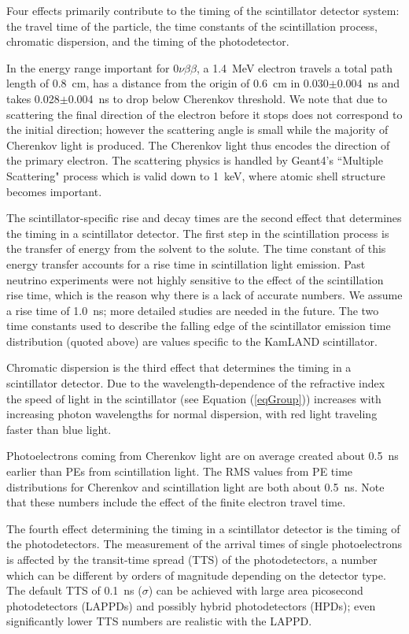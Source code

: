 Four effects primarily contribute to the timing of the scintillator detector
system: the travel time of the particle, the time constants of the scintillation process, chromatic dispersion, and the timing of the photodetector.

In the energy range important for $0\nu\beta\beta$, a 1.4~MeV electron travels a total path length of 0.8~cm, has a distance from the origin of 0.6~cm in 0.030$\pm$0.004~ns  and takes 0.028$\pm$0.004~ns to drop below Cherenkov threshold. We note that due to scattering the final direction of the electron before it stops does not correspond to the initial direction; however the scattering angle is small while the majority of Cherenkov light is produced. The Cherenkov light thus encodes the direction of the primary electron. The scattering physics is handled by Geant4's ``Multiple Scattering" process which is valid down to 1~keV, where atomic shell structure becomes important\cite{geant4scatt}.


The scintillator-specific rise and decay times are the second effect that determines the timing in a scintillator detector. The first step in the scintillation process is the transfer of energy from the solvent to the solute. The time constant of this
energy transfer accounts for a rise time in scintillation light
emission. Past neutrino experiments were not highly sensitive to the
effect of the scintillation rise time, which is the reason why there
is a lack of accurate numbers. We assume a rise time of 1.0~ns; more
detailed studies are needed in the future. The two time constants used
to describe the falling edge of the scintillator emission time
distribution (quoted above) are values specific to the KamLAND
scintillator.

Chromatic dispersion is the third effect that determines the timing in a scintillator detector. Due to the wavelength-dependence of the refractive index the speed of
light in the scintillator (see Equation (\ref{eqGroup})) increases
with increasing photon wavelengths for normal dispersion, with red
light traveling faster than blue light.

Photoelectrons coming from Cherenkov light are on average
created about 0.5~ns earlier than PEs from scintillation light. The
RMS values from PE time distributions for Cherenkov and scintillation
light are both about 0.5~ns. Note that these numbers include the
effect of the finite electron travel time.

The fourth effect determining the timing in a scintillator detector is the timing of the photodetectors. The measurement of the arrival times of single photoelectrons is
affected by the transit-time spread (TTS) of the photodetectors, a
number which can be different by orders of magnitude depending on the
detector type. The default TTS of 0.1~ns ($\sigma$) can be achieved with large area picosecond photodetectors
(LAPPDs)\cite{Adams:2013nva,RSI_paper,PSEC4_paper,anode_paper} and possibly hybrid photodetectors
(HPDs)\cite{hpdThesis}; even significantly lower TTS numbers are
realistic with the LAPPD\cite{RSI_paper,PSEC4_paper,anode_paper}.


